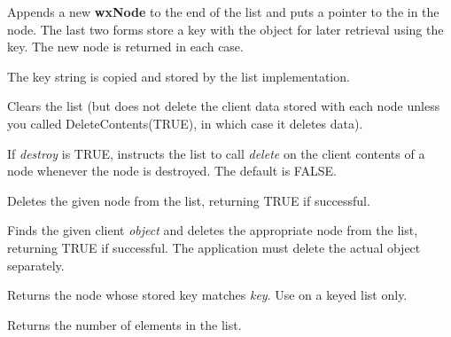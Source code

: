 Appends a new {\bf wxNode} to the end of the list and puts a pointer to the
 in the node.  The last two forms store a key with the object for
later retrieval using the key. The new node is returned in each case.

The key string is copied and stored by the list implementation.

\label{wxlistclear}


Clears the list (but does not delete the client data stored with each node
unless you called DeleteContents(TRUE), in which case it deletes data).

\label{wxlistdeletecontents}


If {\it destroy} is TRUE, instructs the list to call {\it delete} on the client contents of
a node whenever the node is destroyed. The default is FALSE.

\label{wxlistdeletenode}


Deletes the given node from the list, returning TRUE if successful.

\label{wxlistdeleteobject}


Finds the given client {\it object} and deletes the appropriate node from the list, returning
TRUE if successful. The application must delete the actual object separately.

\label{wxlistfind}



Returns the node whose stored key matches {\it key}. Use on a keyed list only.

\label{wxlistgetcount}


Returns the number of elements in the list.

\label{wxlistgetfirst}


